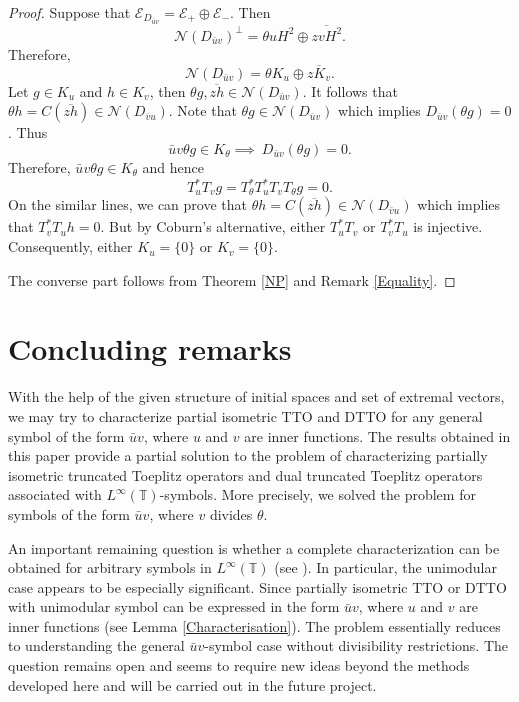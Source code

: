 \documentclass[12pt]{amsart}
\newcommand{\cle}{\mathcal{E}}
\newcommand{\cln}{\mathcal{N}}
\newcommand{\T}{\mathbb{T}}
\newcommand{\h}{{H}^2}
\theoremstyle{definition}
\theoremstyle{plain}
\theoremstyle{definition}
\numberwithin{equation}{section}
\begin{document}
\begin{proof}
Suppose that $\cle_{D_{\bar{u}v}}=\cle_+ \oplus \cle_-$. Then
\[
\cln(D_{\bar{u}v})^\perp=\theta u \h \oplus \overline{zv\h}.
\]
Therefore,
\[
\cln(D_{\bar{u}v})=\theta K_u \oplus \overline{zK_v}.
\]
Let $g \in K_u$ and $h \in K_v$, then $\theta g, \overline{zh}\in \cln(D_{\bar{u}v})$. 
It follows that $\theta h =C(\overline{zh}) \in \cln(D_{\bar{v}u})$. Note that $\theta g \in \cln(D_{\bar{u}v})$ which implies $D_{\bar{u}v}(\theta g)=0$. Thus
\[
\bar{u}v \theta g \in K_\theta \implies \ D_{\bar{u}v}(\theta g)=0.
\]
Therefore, $\bar{u}v \theta g \in K_\theta$ and hence 
\[
T_u^* T_vg = T_\theta^*T_u^*T_vT_\theta g =0.
\]
On the similar lines, we can prove that $\theta h =C(\overline{zh}) \in \cln(D_{\bar{v}u})$ which implies that $T_v^*T_uh=0$. But by Coburn's alternative, either $T_u^*T_v$ or $T_v^*T_u$ is injective. Consequently, either $K_u =\{0\}$ or $K_v=\{0\}$.

The converse part follows from Theorem \ref{NP} and Remark \ref{Equality}.		
\end{proof}
	


\section{Concluding remarks}
	
With the help of the given structure of initial spaces and set of extremal vectors, we may try to characterize partial isometric TTO and DTTO for any general symbol of the form $\bar{u}v$, where $u$ and $v$ are inner functions.
The results obtained in this paper provide a partial solution to the problem of characterizing partially isometric truncated Toeplitz operators and dual truncated Toeplitz operators associated with $L^{\infty}(\T)$-symbols. More precisely, we solved the problem for symbols of the form $\bar{u}v$, where $v$ divides $\theta$.

An important remaining question is whether a complete characterization can be obtained for arbitrary symbols in $L^{\infty}(\T)$ (see \cite{DEBNATH-PRADHAN-SARKAR}). In particular, the unimodular case appears to be especially significant. Since partially isometric TTO or DTTO with unimodular symbol can be expressed in the form $\bar{u}v$, where $u$ and $v$ are inner functions (see Lemma \ref{Characterisation}). The problem essentially reduces to understanding the general $\bar{u}v$-symbol case without divisibility restrictions. The question remains open and seems to require new ideas beyond the methods developed here and will be carried out in the future project.	
	
\end{document}
